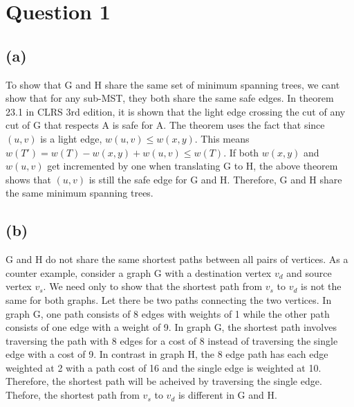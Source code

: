 \section{Question 1}
	\subsection{(a)}
	To show that G and H share the same set of minimum spanning trees, we cant show that for any sub-MST, they both share the same safe edges.
	In theorem 23.1 in CLRS 3rd edition, it is shown that the light edge crossing the cut of any cut of G that respects A is safe for A.
	The theorem uses the fact that since $(u,v)$ is a light edge, $w(u,v) \leq w(x,y)$. 
	This means $w(T') = w(T) - w(x,y) + w(u,v) \leq w(T)$.
	If both $w(x,y)$ and $w(u,v)$ get incremented by one when translating G to H, the above theorem shows that $(u, v)$ is still the safe edge for G and H.
	Therefore, G and H share the same minimum spanning trees.

	\subsection{(b)}
		G and H do not share the same shortest paths between all pairs of vertices.
		\linebreak
		As a counter example, consider a graph G with a destination vertex $v_d$ and source vertex $v_s$.
		We need only to show that the shortest path from $v_s$ to $v_d$ is not the same for both graphs.
		Let there be two paths connecting the two vertices. In graph G, one path consists of 8 edges with weights of 1
		while the other path consists of one edge with a weight of 9. In graph G, the shortest path involves traversing
		the path with 8 edges for a cost of 8 instead of traversing the single edge with a cost of 9. In contrast in graph H,
		the 8 edge path has each edge weighted at 2 with a path cost of 16 and the single edge is weighted at 10. Therefore,
		the shortest path will be acheived by traversing the single edge. Thefore, the shortest path from $v_s$ to $v_d$ is
		different in G and H.